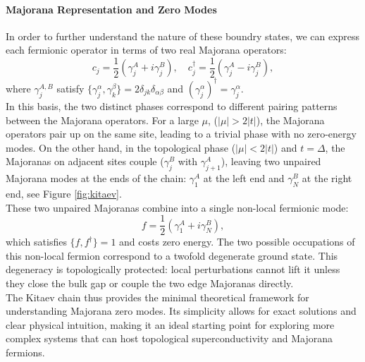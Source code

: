 \paragraph{Majorana Representation and Zero Modes}
In order to further understand the nature of these boundry states, we can express each fermionic operator in terms of two real Majorana operators:
\begin{equation}
c_j = \frac{1}{2}(\gamma_j^A + i\gamma_j^B), \quad
c_j^\dagger = \frac{1}{2}(\gamma_j^A - i\gamma_j^B),
\label{eq:first_majorana_rep}
\end{equation}
where $\gamma_j^{A,B}$ satisfy $\{\gamma_j^\alpha, \gamma_k^\beta\} = 2\delta_{jk}\delta_{\alpha\beta}$ and $(\gamma_j^\alpha)^\dagger = \gamma_j^\alpha$.\\
In this basis, the two distinct phases correspond to different pairing patterns between the Majorana operators. For a large $μ$, ($|μ| > 2|t|$), the Majorana operators pair up on the same site, leading to a trivial phase with no zero-energy modes. On the other hand, in the topological phase ($|μ| < 2|t|$) and $t = Δ$, the Majoranas on adjacent sites couple ($\gamma_j^B$ with $\gamma_{j+1}^A$), leaving two unpaired Majorana modes at the ends of the chain: $\gamma_1^A$ at the left end and $\gamma_N^B$ at the right end, see Figure \ref{fig:kitaev}.\\
These two unpaired Majoranas combine into a single non-local fermionic mode:
\begin{equation}
  f = \frac{1}{2 }(\gamma_1^A + i\gamma_N^B),
\end{equation}
which satisfies $\{f, f^\dagger\} = 1$ and costs zero energy. The two possible occupations of this non-local fermion correspond to a twofold degenerate ground state. This degeneracy is topologically protected: local perturbations cannot lift it unless they close the bulk gap or couple the two edge Majoranas directly.\\
The Kitaev chain thus provides the minimal theoretical framework for understanding Majorana zero modes. Its simplicity allows for exact solutions and clear physical intuition, making it an ideal starting point for exploring more complex systems that can host topological superconductivity and Majorana fermions.


